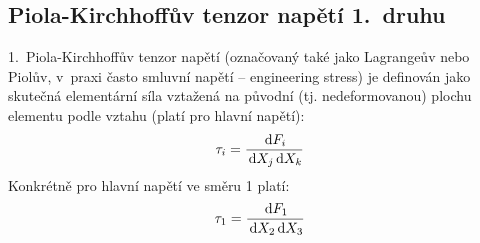 
\subsection{Piola-Kirchhoffův tenzor napětí 1.~druhu}
1.~Piola-Kirchhoffův tenzor napětí (označovaný také jako Lagrangeův nebo Piolův, v~praxi často smluvní napětí -- engineering stress) je definován jako skutečná elementární síla vztažená na původní (tj. nedeformovanou) plochu elementu podle vztahu (platí pro hlavní napětí):
\begin{equation}
	\tau_i = \frac{\,\mathrm{d} F_i}{\,\mathrm{d} X_j \,\mathrm{d} X_k}
\end{equation}
Konkrétně pro hlavní napětí ve směru 1 platí:
\begin{equation}
	\tau_1 = \frac{\,\mathrm{d} F_1}{\,\mathrm{d} X_2 \,\mathrm{d} X_3}
\end{equation}

